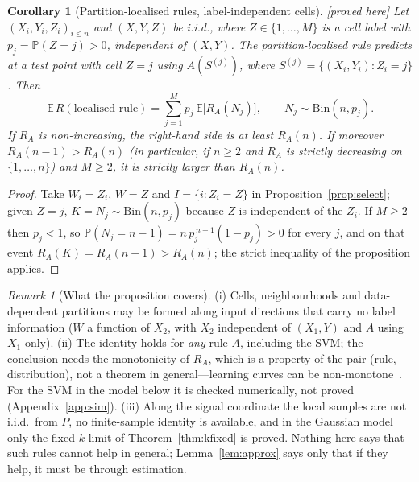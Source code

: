 \documentclass[11pt,a4paper]{article}
\theoremstyle{plain}
\newtheorem{corollary}[theorem]{Corollary}
\theoremstyle{definition}
\theoremstyle{remark}
\newtheorem{remark}[theorem]{Remark}
\newcommand{\E}{\mathbb{E}}
\newcommand{\Prob}{\mathbb{P}}
\newcommand{\Risk}{R}
\newcommand{\status}[1]{\textsf{\small [#1]}}
\begin{document}
\begin{corollary}[Partition-localised rules, label-independent cells]\label{cor:thin}\status{proved here}
Let $(X_i,Y_i,Z_i)_{i\le n}$ and $(X,Y,Z)$ be i.i.d., where $Z\in\{1,\dots,M\}$ is a cell label with $p_j=\Prob(Z=j)>0$, independent of $(X,Y)$. The \emph{partition-localised rule} predicts at a test point with cell $Z=j$ using $A(S^{(j)})$, where $S^{(j)}=\{(X_i,Y_i):Z_i=j\}$. Then
\[
\E\,\Risk(\text{localised rule})=\sum_{j=1}^M p_j\,\E\bigl[\Risk_A(N_j)\bigr],\qquad N_j\sim\mathrm{Bin}(n,p_j).
\]
If $\Risk_A$ is non-increasing, the right-hand side is at least $\Risk_A(n)$. If moreover $\Risk_A(n-1)>\Risk_A(n)$ (in particular, if $n\ge2$ and $\Risk_A$ is strictly decreasing on $\{1,\dots,n\}$) and $M\ge2$, it is strictly larger than $\Risk_A(n)$.
\end{corollary}
\begin{proof}
Take $W_i=Z_i$, $W=Z$ and $I=\{i:Z_i=Z\}$ in Proposition~\ref{prop:select}; given $Z=j$, $K=N_j\sim\mathrm{Bin}(n,p_j)$ because $Z$ is independent of the $Z_i$. If $M\ge2$ then $p_j<1$, so $\Prob(N_j=n-1)=n\,p_j^{\,n-1}(1-p_j)>0$ for every $j$, and on that event $\Risk_A(K)=\Risk_A(n-1)>\Risk_A(n)$; the strict inequality of the proposition applies.
\end{proof}

\begin{remark}[What the proposition covers]\label{rem:covers}
(i) Cells, neighbourhoods and data-dependent partitions may be formed along input directions that carry no label information ($W$ a function of $X_2$, with $X_2$ independent of $(X_1,Y)$ and $A$ using $X_1$ only). (ii) The identity holds for \emph{any} rule $A$, including the SVM; the conclusion needs the monotonicity of $\Risk_A$, which is a property of the pair (rule, distribution), not a theorem in general---learning curves can be non-monotone~\citep{viering2023}. For the SVM in the model below it is checked numerically, not proved (Appendix~\ref{app:sim}). (iii) Along the signal coordinate the local samples are not i.i.d.\ from $P$, no finite-sample identity is available, and in the Gaussian model only the fixed-$k$ limit of Theorem~\ref{thm:kfixed} is proved. Nothing here says that such rules cannot help in general; Lemma~\ref{lem:approx} says only that if they help, it must be through estimation.
\end{remark}
\end{document}
